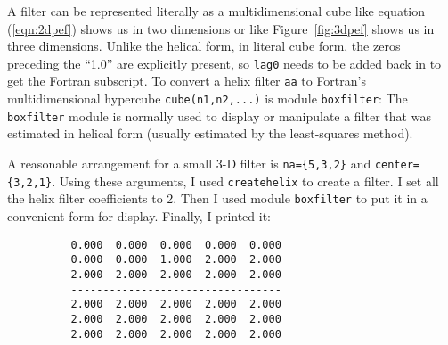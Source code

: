 \par
A filter can be represented literally as a multidimensional cube
like equation (\ref{eqn:2dpef}) shows us in two dimensions
or like Figure~\ref{fig:3dpef} shows us in three dimensions.
Unlike the helical form, in literal cube form,
the zeros preceding the ``1.0'' are explicitly present,
so \texttt{lag0} needs to be added back in to get the Fortran subscript.
To convert a helix filter \texttt{aa} to Fortran's multidimensional hypercube
\texttt{cube(n1,n2,...)} is
module \texttt{boxfilter}: %
The \texttt{boxfilter} module is normally used
to display or manipulate a filter
that was estimated in helical form
(usually estimated by the least-squares method).

\begin{comment}
\par
The inverse process to \texttt{boxfilter} is to
convert a Fortran hypercube to a helix filter.
For this we have module \texttt{unbox}. %
It abandons all zero-valued coefficients
such as those that should be zero before the box's 1.0.
It abandons the ``1.0'' as well, because it is implicitly present
in the helix convolution module \texttt{helicon} \vpageref{lst:helicon}.
\moddex{unbox}{Convert hypercube filter to helix}
An example of using \texttt{unbox} would be copying some numbers,
such as the factored Laplacian in equation (\ref{eqn:lapfac})
into a cube and then converting it to a helix.
\end{comment}

\par
A reasonable arrangement for a small 3-D filter is 
\texttt{na=\{5,3,2\}}
and
\texttt{center=\{3,2,1\}}.
Using these arguments, I used 
\texttt{createhelix} 
to create a filter.
I set all the helix filter coefficients to 2.
Then I used module \texttt{boxfilter} 
to put it in a convenient form for display.
Finally, I printed it:
\par\noindent
\footnotesize
\begin{verbatim}
          0.000  0.000  0.000  0.000  0.000
          0.000  0.000  1.000  2.000  2.000
          2.000  2.000  2.000  2.000  2.000
          ---------------------------------
          2.000  2.000  2.000  2.000  2.000
          2.000  2.000  2.000  2.000  2.000
          2.000  2.000  2.000  2.000  2.000
\end{verbatim}
\normalsize
\par\noindent


